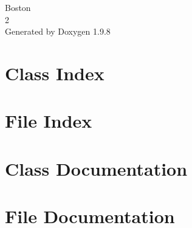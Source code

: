 \documentclass[twoside]{book}
\newcommand{\+}{\discretionary{\mbox{\scriptsize$\hookleftarrow$}}{}{}}
\newcommand{\clearemptydoublepage}{%
    \newpage{\pagestyle{empty}\cleardoublepage}%
  }
\begin{document}
  \raggedbottom
    \hypersetup{pageanchor=false,
                bookmarksnumbered=true,
                pdfencoding=unicode
               }
  \begin{titlepage}
  \vspace*{7cm}
  \begin{center}%
  {\Large Boston}\\
  [1ex]\large 2 \\
  \vspace*{1cm}
  {\large Generated by Doxygen 1.9.8}\\
  \end{center}
  \end{titlepage}
  \clearemptydoublepage
  \tableofcontents
  \clearemptydoublepage
  \hypersetup{pageanchor=true}
\chapter{Class Index}

\chapter{File Index}

\chapter{Class Documentation}




\chapter{File Documentation}


















  \backmatter
  \newpage
  \clearemptydoublepage
  \printindex
\end{document}
